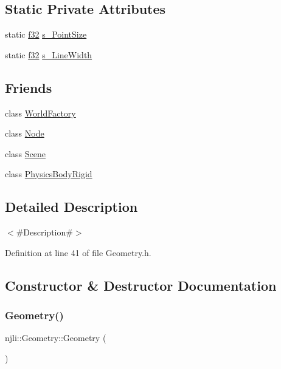 \subsection*{Static Private Attributes}
\begin{DoxyCompactItemize}
\item 
static \mbox{\hyperlink{_util_8h_a5f6906312a689f27d70e9d086649d3fd}{f32}} \mbox{\hyperlink{classnjli_1_1_geometry_a4719e7a6be0324ad5a3369e563c8528a}{s\+\_\+\+Point\+Size}}
\item 
static \mbox{\hyperlink{_util_8h_a5f6906312a689f27d70e9d086649d3fd}{f32}} \mbox{\hyperlink{classnjli_1_1_geometry_a31da0cda6afa6d640ce54b5c6642cf73}{s\+\_\+\+Line\+Width}}
\end{DoxyCompactItemize}
\subsection*{Friends}
\begin{DoxyCompactItemize}
\item 
class \mbox{\hyperlink{classnjli_1_1_geometry_acb96ebb09abe8f2a37a915a842babfac}{World\+Factory}}
\item 
class \mbox{\hyperlink{classnjli_1_1_geometry_a6db9d28bd448a131448276ee03de1e6d}{Node}}
\item 
class \mbox{\hyperlink{classnjli_1_1_geometry_a032858ae1fe02d2d1170981c2af2d67c}{Scene}}
\item 
class \mbox{\hyperlink{classnjli_1_1_geometry_ada345e4f9c2a87f06868b74d30e94ad2}{Physics\+Body\+Rigid}}
\end{DoxyCompactItemize}


\subsection{Detailed Description}
$<$\#\+Description\#$>$ 

Definition at line 41 of file Geometry.\+h.



\subsection{Constructor \& Destructor Documentation}
\mbox{\label{classnjli_1_1_geometry_aa4130386ba85c7f15437fc3539530cc2}} 
\subsubsection{\texorpdfstring{Geometry()}{Geometry()}\hspace{0.1cm}{\footnotesize\ttfamily [1/3]}}
{\footnotesize\ttfamily njli\+::\+Geometry\+::\+Geometry (\begin{DoxyParamCaption}{ }\end{DoxyParamCaption})\hspace{0.3cm}{\ttfamily [protected]}}

